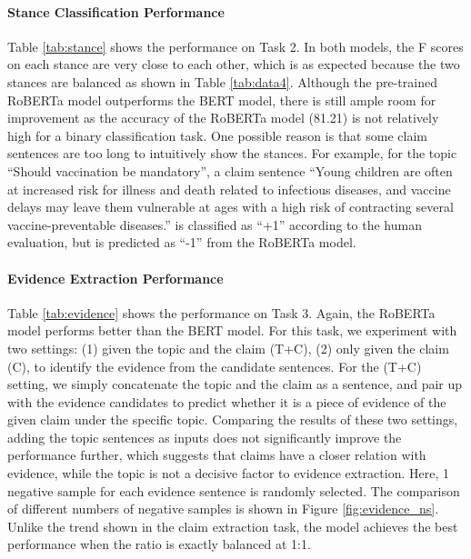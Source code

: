 \documentclass[11pt]{article}
\begin{document}
\paragraph{Stance Classification Performance}
Table \ref{tab:stance} shows the performance on Task 2.
In both models, the F scores on each stance are very close to each other, which is as expected because the two stances are balanced as shown in Table \ref{tab:data4}.
Although the pre-trained RoBERTa model outperforms the BERT model, there is still ample room for improvement as the accuracy of the RoBERTa model (81.21) is not relatively high for a binary classification task.
One possible reason is that some claim sentences are too long to intuitively show the stances.
For example, for the topic ``Should vaccination be mandatory'', a claim sentence ``Young children are often at increased risk for illness and death related to infectious diseases, and vaccine delays may leave them vulnerable at ages with a high risk of contracting several vaccine-preventable diseases.'' is classified as ``+1'' according to the human evaluation, but is predicted as ``-1'' from the RoBERTa model.


















\paragraph{Evidence Extraction Performance}
Table \ref{tab:evidence} shows the performance on Task 3.
Again, the RoBERTa model performs better than the BERT model.
For this task, we experiment with two settings:
(1) given the topic and the claim (T+C), (2) only given the claim (C), to identify the evidence from the candidate sentences. 
For the (T+C) setting, we simply concatenate the topic and the claim as a sentence, and pair up with the evidence candidates to predict whether it is a piece of evidence of the given claim under the specific topic.
Comparing the results of these two settings, adding the topic sentences as inputs does not significantly improve the performance further, which suggests that claims have a closer relation with evidence, while the topic is not a decisive factor to evidence extraction.
Here, 1 negative sample for each evidence sentence is randomly selected.
The comparison of different numbers of negative samples is shown in Figure \ref{fig:evidence_ns}.
Unlike the trend shown in the claim extraction task, the model achieves the best performance when the ratio is exactly balanced at 1:1.
\end{document}
